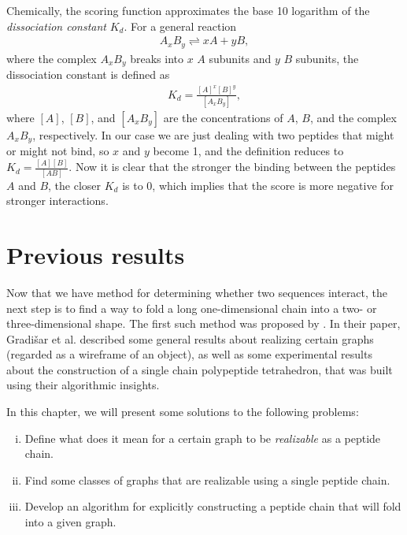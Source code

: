 \documentclass[12pt,a4paper,titlepage,openany]{report}
\begin{document}
Chemically, the scoring function approximates the base 10 logarithm of the \emph{dissociation constant} $K_d$. For a general reaction 
\begin{align}
A_xB_y \rightleftharpoons xA + yB,
\end{align}
where the complex $A_xB_y$ breaks into $x$ $A$ subunits and $y$ $B$ subunits, the dissociation constant is defined as
\begin{align}
K_d = \frac{[A]^x [B]^y}{[A_xB_y]},
\end{align}
where $[A]$, $[B]$, and $[A_xB_y]$ are the concentrations of $A$, $B$, and the complex $A_xB_y$, respectively. In our case we are just dealing with two peptides that might or might not bind, so $x$ and $y$ become 1, and the definition reduces to $K_d = \frac{[A][B]}{[AB]}$. Now it is clear that the stronger the binding between the peptides $A$ and $B$, the closer $K_d$ is to 0, which implies that the score is more negative for stronger interactions.

\chapter{Previous results}
\thispagestyle{fancy}
\label{chap:Previous results}

Now that we have method for determining whether two sequences interact, the next step is to find a way to fold a long one-dimensional chain into a two- or three-dimensional shape. The first such method was proposed by \cite{gradivsar2013design}. In their paper, Gradišar et al. described some general results about realizing certain graphs (regarded as a wireframe of an object), as well as some experimental results about the construction of a single chain polypeptide tetrahedron, that was built using their algorithmic insights.

In this chapter, we will present some solutions to the following problems:
\begin{enumerate}[(i)]
	\item Define what does it mean for a certain graph to be \emph{realizable} as a peptide chain. \label{item:previous work question 1}
	\item Find some classes of graphs that are realizable using a single peptide chain. \label{item:previous work question 2}
	\item Develop an algorithm for explicitly constructing a peptide chain that will fold into a given graph. \label{item:previous work question 3}
\end{enumerate}
\end{document}
